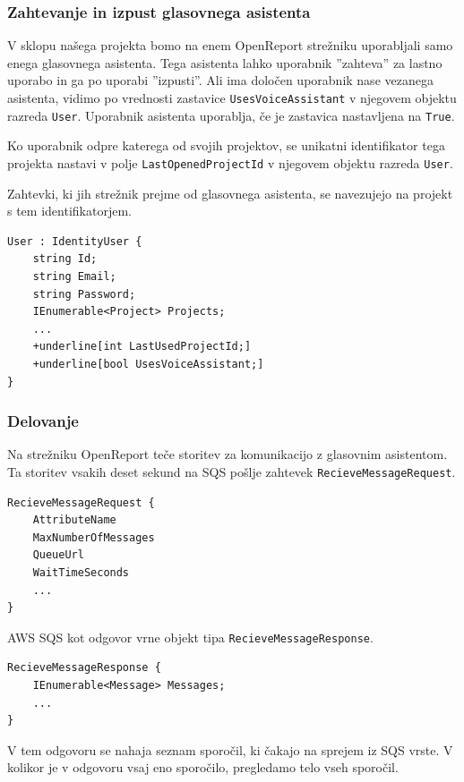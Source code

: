 \documentclass[a4paper, 12pt]{book}
\begin{document}
\subsubsection{Zahtevanje in izpust glasovnega asistenta}

V sklopu našega projekta bomo na enem OpenReport strežniku uporabljali samo enega glasovnega asistenta.
Tega asistenta lahko uporabnik ''zahteva'' za lastno uporabo in ga po uporabi ''izpusti''.
Ali ima določen uporabnik nase vezanega asistenta, vidimo po vrednosti zastavice \texttt{UsesVoiceAssistant} v njegovem objektu razreda \texttt{User}.
Uporabnik asistenta uporablja, če je zastavica nastavljena na \texttt{True}.

Ko uporabnik odpre katerega od svojih projektov, se unikatni identifikator tega projekta nastavi v polje \texttt{LastOpenedProjectId} v njegovem objektu razreda \texttt{User}.

Zahtevki, ki jih strežnik prejme od glasovnega asistenta, se navezujejo na projekt s tem identifikatorjem.

\begin{Verbatim}[commandchars=+\[\]]
User : IdentityUser {
    string Id; 
    string Email;
    string Password; 
    IEnumerable<Project> Projects;
    ... 
    +underline[int LastUsedProjectId;]
    +underline[bool UsesVoiceAssistant;]
}
\end{Verbatim}

\subsubsection{Delovanje}

Na strežniku OpenReport teče storitev za komunikacijo z glasovnim asistentom.
Ta storitev vsakih deset sekund na SQS pošlje zahtevek \texttt{RecieveMessageRequest}.

\begin{Verbatim}[commandchars=+\[\]]
RecieveMessageRequest {
    AttributeName 
    MaxNumberOfMessages 
    QueueUrl 
    WaitTimeSeconds
    ... 
} 
\end{Verbatim}

AWS SQS kot odgovor vrne objekt tipa \texttt{RecieveMessageResponse}.

\begin{Verbatim}[commandchars=+\[\]]
RecieveMessageResponse {
    IEnumerable<Message> Messages;
    ...
}
\end{Verbatim}

V tem odgovoru se nahaja seznam sporočil, ki čakajo na sprejem iz SQS vrste.
V kolikor je v odgovoru vsaj eno sporočilo, pregledamo telo vseh sporočil. 
\end{document}

